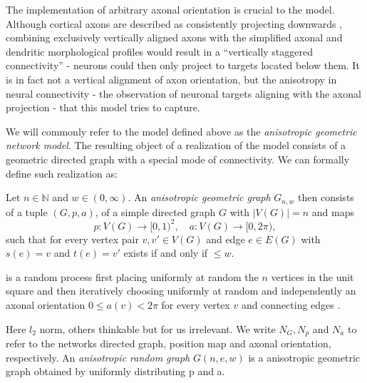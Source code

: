 The implementation of arbitrary axonal orientation is crucial to the
model. Although cortical axons are described as consistently
projecting downwards \parencite[%
cf. Section~\ref{sec:biol_anisotropy}]{Braitenberg_Cortex}, combining
exclusively vertically aligned axons with the simplified axonal and
dendritic morphological profiles would result in a \enquote{vertically
  staggered connectivity} - neurons could then only project to targets
located below them.  It is in fact not a vertical alignment of axon
orientation, but the anisotropy in neural connectivity - the
observation of neuronal targets aligning with the axonal projection -
that this model tries to capture. 



We will commonly refer to the model defined above as the
\textit{anisotropic geometric network model}. The resulting object of
a realization of the model consists of a geometric directed graph
with a special mode of connectivity. We can formally define such
realization as:

\begin{definition}
\label{def:anisotropic_geometric_graph} 
Let $n \in \mathbb{N}$ and $w \in (0,\infty)$. An
\textit{anisotropic geometric graph} $G_{n,w}$ then consists of a
tuple $(G,p,a)$, of a simple directed graph $G$ with $|V(G)|=n$ and
maps \[p:V(G)\to[0,1)^2, \quad a:V(G)\to[0,2\pi),\] such that for every
vertex pair $v,v' \in V(G)$ and edge $e\in E(G)$ with $s(e)=v$ and
$t(e)=v'$ exists if and only if $\le w$. %
\end{definition}


\begin{definition} is a random process
  first placing uniformly at random the $n$ vertices in the unit
  square and then iteratively choosing uniformly at random and
  independently an axonal orientation $0\leq a(v) < 2\pi$ for every
  vertex $v$ and
  connecting edges .
\end{definition}



\begin{remark} 
Here $l_2$ norm, others thinkable but for us irrelevant.
We write $N_G, N_p$ and $N_a$ to refer to the networks directed graph,
position map and axonal orientation, respectively. 
An \textit{anisotropic random graph} $G(n,e,w)$ is a anisotropic
geometric graph obtained by uniformly distributing p and a. %
\end{remark}



